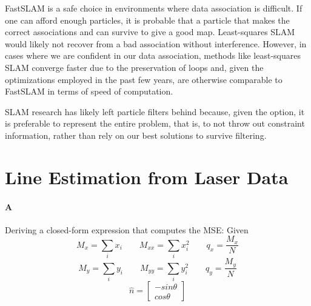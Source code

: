 \documentclass[12pt]{article}
\begin{document}
FastSLAM is a safe choice in environments where data association is difficult.
If one can afford enough particles, it is probable that a particle that makes
the correct associations and can survive to give a good map. Least-squares SLAM
would likely not recover from a bad association without interference. However,
in cases where we are confident in our data association, methods like
least-squares SLAM converge faster due to the preservation of loops and, given
the optimizations employed in the past few years, are otherwise comparable to
FastSLAM in terms of speed of computation.

SLAM research has likely left particle filters behind because, given the option,
it is preferable to represent the entire problem, that is, to not throw out
constraint information, rather than rely on our best solutions to survive
filtering. %

\section{Line Estimation from Laser Data}

\paragraph{A}Deriving a closed-form expression that computes the MSE:
Given 
$$M_x = \displaystyle\sum_i x_i \qquad M_{xx} = \displaystyle\sum_i x_i^2 \qquad q_x = \frac{M_x}{N}$$
$$M_y = \displaystyle\sum_i y_i \qquad M_{yy} = \displaystyle\sum_i y_i^2 \qquad q_y = \frac{M_y}{N}$$
 $$\hat{n} = \left[ \begin{array}{c}
-sin\theta \\
cos\theta
\end{array}\right]$$
 
\end{document}
